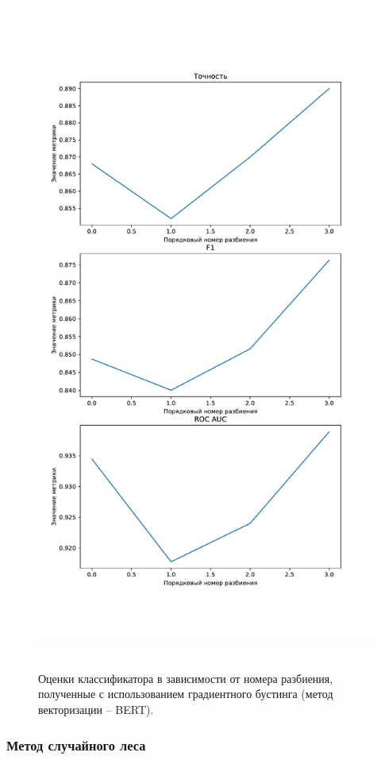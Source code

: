 \begin{figure}[H]
	\centering
	\includegraphics[height=23cm]{inc/plots/gradientMetricsBert.pdf}
	\caption{ Оценки классификатора в зависимости от номера разбиения, полученные с использованием градиентного бустинга (метод векторизации -- BERT). }
	\label{img:gradientMetricsBert}
\end{figure}



\subsubsection{Метод случайного леса }

